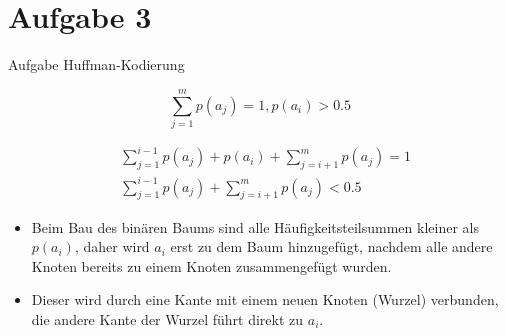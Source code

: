 
\section{Aufgabe 3}

\setcounter{exercise}{1}

\begin{frame}[allowframebreaks]{Aufgabe \thesection}{Huffman-Kodierung}
  \begin{requirementsnoinc}
    \[
      \sum_{j=1}^{m}p(a_{j})=1,p(a_{i})> 0.5
    \]
  \end{requirementsnoinc}
  \begin{solutionnoinc}
    \begin{align*}
      &\sum_{j=1}^{i-1}p(a_{j})+p(a_{i})+\sum_{j=i+1}^{m}p(a_{j})=1\\
      &\sum_{j=1}^{i-1}p(a_{j})+\sum_{j=i+1}^{m}p(a_{j})< 0.5
    \end{align*}
  \end{solutionnoinc}
  \begin{solutionnoinc}
    \begin{itemize}
      \item Beim Bau des binären Baums sind alle Häufigkeitsteilsummen kleiner als $p(a_i)$, daher wird $a_i$ erst zu dem Baum hinzugefügt, nachdem alle andere Knoten bereits zu einem Knoten zusammengefügt wurden. 
      \item Dieser wird durch eine Kante mit einem neuen Knoten (Wurzel) verbunden, die andere Kante der Wurzel führt direkt zu $a_i$.
    \end{itemize}
    \vspace{0.5cm}
  \end{solutionnoinc}
\end{frame}

